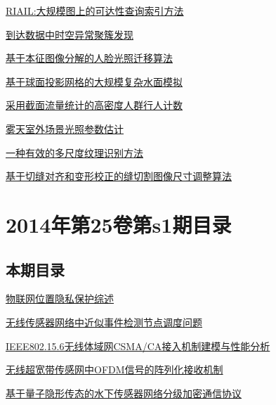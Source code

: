 \documentclass[a4paper]{article}
\begin{document}
\href{http://www.jos.org.cn/ch/reader/download_pdf.aspx?file_no=14039&year_id=2014&quarter_id=S2&falg=1}{RIAIL:大规模图上的可达性查询索引方法}

\href{http://www.jos.org.cn/ch/reader/download_pdf.aspx?file_no=14040&year_id=2014&quarter_id=S2&falg=1}{到达数据中时空异常聚簇发现}

\href{http://www.jos.org.cn/ch/reader/download_pdf.aspx?file_no=14041&year_id=2014&quarter_id=S2&falg=1}{基于本征图像分解的人脸光照迁移算法}

\href{http://www.jos.org.cn/ch/reader/download_pdf.aspx?file_no=14042&year_id=2014&quarter_id=S2&falg=1}{基于球面投影网格的大规模复杂水面模拟}

\href{http://www.jos.org.cn/ch/reader/download_pdf.aspx?file_no=14043&year_id=2014&quarter_id=S2&falg=1}{采用截面流量统计的高密度人群行人计数}

\href{http://www.jos.org.cn/ch/reader/download_pdf.aspx?file_no=14044&year_id=2014&quarter_id=S2&falg=1}{雾天室外场景光照参数估计}

\href{http://www.jos.org.cn/ch/reader/download_pdf.aspx?file_no=14045&year_id=2014&quarter_id=S2&falg=1}{一种有效的多尺度纹理识别方法}

\href{http://www.jos.org.cn/ch/reader/download_pdf.aspx?file_no=14046&year_id=2014&quarter_id=S2&falg=1}{基于切缝对齐和变形校正的缝切割图像尺寸调整算法}


\section{\textbf{2014年第25卷第s1期目录}}
\subsection{本期目录}
\href{http://www.jos.org.cn/ch/reader/download_pdf.aspx?file_no=14001&year_id=2014&quarter_id=s1&falg=1}{物联网位置隐私保护综述}

\href{http://www.jos.org.cn/ch/reader/download_pdf.aspx?file_no=14002&year_id=2014&quarter_id=s1&falg=1}{无线传感器网络中近似事件检测节点调度问题}

\href{http://www.jos.org.cn/ch/reader/download_pdf.aspx?file_no=14003&year_id=2014&quarter_id=s1&falg=1}{IEEE802.15.6无线体域网CSMA/CA接入机制建模与性能分析}

\href{http://www.jos.org.cn/ch/reader/download_pdf.aspx?file_no=14004&year_id=2014&quarter_id=s1&falg=1}{无线超宽带传感网中OFDM信号的阵列化接收机制}

\href{http://www.jos.org.cn/ch/reader/download_pdf.aspx?file_no=14005&year_id=2014&quarter_id=s1&falg=1}{基于量子隐形传态的水下传感器网络分级加密通信协议}
\end{document}

